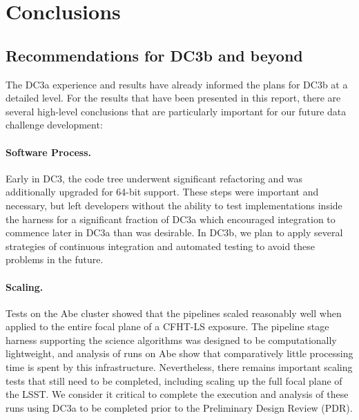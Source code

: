 
\section{Conclusions}

\subsection{Recommendations for DC3b and beyond}

The DC3a experience and results have already informed the plans for
DC3b at a detailed level.  For the results that have been presented in
this report, there are several high-level conclusions that are
particularly important for our future data challenge development:

\paragraph{Software Process.}  Early in DC3, the code tree underwent
significant refactoring and was additionally upgraded for 64-bit
support. These steps were important and necessary, but left developers
without the ability to test implementations inside the harness for a
significant fraction of DC3a which encouraged integration to commence
later in DC3a than was desirable.  In DC3b, we plan to apply several
strategies of continuous integration and automated testing to avoid
these problems in the future.  

\paragraph{Scaling.}  Tests on the Abe cluster showed that the
pipelines scaled reasonably well when applied to the entire focal
plane of a CFHT-LS exposure. The pipeline stage harness supporting the
science algorithms was designed to be computationally lightweight, and
analysis of runs on Abe show that comparatively little processing time
is spent by this infrastructure.  Nevertheless, there remains
important scaling tests that still need to be completed, including
scaling up the full focal plane of the LSST.  We consider it critical
to complete the execution and analysis of these runs using DC3a to be
completed prior to the Preliminary Design Review (PDR).  

